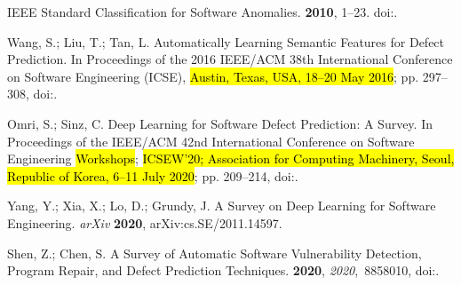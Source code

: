 \documentclass[mathematics,review,accept,moreauthors,pdftex]{Definitions/mdpi}
\begin{document}

%
\begin{thebibliography}{999}

IEEE Standard Classification for Software Anomalies.
 {\bf 2010},
  1--23.
\newblock
  doi:{\href{https://doi.org/10.1109/IEEESTD.2010.5399061}{}}.

{Wang}, S.; {Liu}, T.; {Tan}, L.
\newblock Automatically Learning Semantic Features for Defect Prediction.
\newblock  In Proceedings of the 2016 IEEE/ACM 38th International Conference on Software Engineering
  (ICSE), \hl{Austin, Texas, USA, 18--20 May 2016}; pp. 297--308,
\newblock
  doi:{\href{https://doi.org/10.1145/2884781.2884804}{}}.

Omri, S.; Sinz, C.
\newblock Deep Learning for Software Defect Prediction: A Survey.
\newblock  In Proceedings of the IEEE/ACM 42nd International Conference on
  Software Engineering \hl{Workshops}; \hl{ICSEW'20; Association for Computing Machinery, 	Seoul, Republic of Korea, 6--11 July 2020}; pp. 209--214,
\newblock
  doi:{\href{https://doi.org/10.1145/3387940.3391463}{}}.

Yang, Y.; Xia, X.; Lo, D.; Grundy, J.
\newblock A Survey on Deep Learning for Software Engineering. \emph{arXiv} \textbf{2020}, arXiv:cs.SE/2011.14597.

Shen, Z.; Chen, S.
\newblock A Survey of Automatic Software Vulnerability Detection, Program
  Repair, and Defect Prediction Techniques.
 {\bf 2020}, {\em
  2020},~8858010,
\newblock
  doi:{\href{https://doi.org/10.1155/2020/8858010}{}}.


\end{thebibliography}
\end{document}
